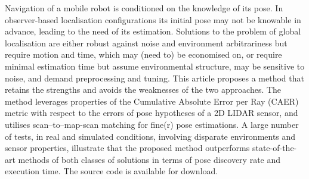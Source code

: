 Navigation of a mobile robot is conditioned on the knowledge of its pose. In
observer-based localisation configurations its initial pose may not be knowable
in advance, leading to the need of its estimation. Solutions to the problem of
global localisation are either robust against noise and environment
arbitrariness but require motion and time, which may (need to) be economised
on, or require minimal estimation time but assume environmental structure, may
be sensitive to noise, and demand preprocessing and tuning. This article
proposes a method that retains the strengths and avoids the weaknesses of the
two approaches. The method leverages properties of the Cumulative Absolute
Error per Ray (CAER) metric with respect to the errors of pose hypotheses of a
2D LIDAR sensor, and utilises scan--to--map-scan matching for fine(r) pose
estimations. A large number of tests, in real and simulated conditions,
involving disparate environments and sensor properties, illustrate that the
proposed method outperforms state-of-the-art methods of both classes of
solutions in terms of pose discovery rate and execution time. The source code
is available for download.
